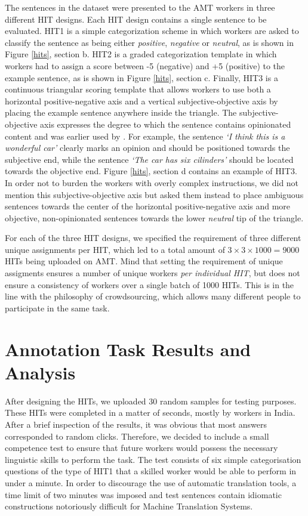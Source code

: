 \documentclass[11pt,letterpaper]{article}
\begin{document}
The sentences in the dataset were presented to the AMT workers in three different HIT designs. Each HIT design contains a single sentence to be evaluated. HIT1 is a simple categorization scheme in which workers are asked to classify the sentence as being either \textit{positive}, \textit{negative} or \textit{neutral}, as is shown in Figure \ref{hits}, section b. HIT2 is a graded categorization template in which workers had to assign a score between -5 (negative) and +5 (positive) to the example sentence, as is shown in Figure \ref{hits}, section c. Finally, HIT3 is a continuous triangular scoring template that allows workers to use both a horizontal positive-negative axis and a vertical subjective-objective axis by placing the example sentence anywhere inside the triangle. The subjective-objective axis expresses the degree to which the sentence contains opinionated content and was earlier used by \cite{sentiwordnet:06}. For example, the sentence \textit{`I think this is a wonderful car'} clearly marks an opinion and should be positioned towards the subjective end, while the sentence \textit{`The car has six cilinders'} should be located towards the objective end. Figure \ref{hits}, section d contains an example of HIT3. In order not to burden the workers with overly complex instructions, we did not mention this subjective-objective axis but asked them instead to place ambiguous sentences towards the center of the horizontal positive-negative axis and more objective, non-opinionated sentences towards the lower \textit{neutral} tip of the triangle.

For each of the three HIT designs, we specified the requirement of three different unique assignments per HIT, which led to a total amount of $3 \times 3 \times 1000 = 9000$ HITs being uploaded on AMT. Mind that setting the requirement of unique assigments ensures a number of unique workers \textit{per individual HIT}, but does not ensure a consistency of workers over a single batch of 1000 HITs. This is in the line with the philosophy of crowdsourcing, which allows many different people to participate in the same task.

\section{Annotation Task Results and Analysis}
\label{sect:results}

After designing the HITs, we uploaded 30 random samples for testing purposes. These HITs were completed in a matter of seconds, mostly by workers in India. After a brief inspection of the results, it was obvious that most answers corresponded to random clicks. Therefore, we decided to include a small competence test to ensure that future workers would possess the necessary linguistic skills to perform the task. The test consists of six simple categorisation questions of the type of HIT1 that a skilled worker would be able to perform in under a minute. In order to discourage the use of automatic translation tools, a time limit of two minutes was  imposed and test sentences contain idiomatic constructions notoriously difficult for Machine Translation Systems.
\end{document}
